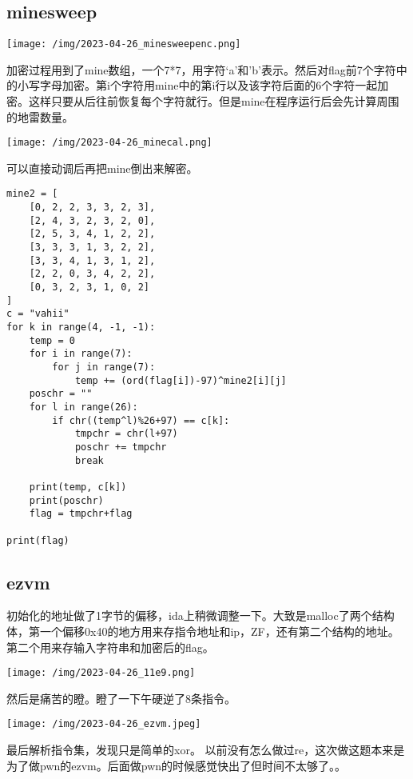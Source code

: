 \documentclass[11pt]{article}
\begin{document}
\subsection{minesweep}
\label{sec:orgc53ffdd}
\begin{center}
\texttt{[image: /img/2023-04-26\_minesweepenc.png]}
\end{center}
加密过程用到了mine数组，一个7*7，用字符‘a'和'b'表示。然后对flag前7个字符中的小写字母加密。第i个字符用mine中的第i行以及该字符后面的6个字符一起加密。这样只要从后往前恢复每个字符就行。但是mine在程序运行后会先计算周围的地雷数量。
\begin{center}
\texttt{[image: /img/2023-04-26\_minecal.png]}
\end{center}
可以直接动调后再把mine倒出来解密。
\begin{verbatim}
mine2 = [
    [0, 2, 2, 3, 3, 2, 3],
    [2, 4, 3, 2, 3, 2, 0],
    [2, 5, 3, 4, 1, 2, 2],
    [3, 3, 3, 1, 3, 2, 2],
    [3, 3, 4, 1, 3, 1, 2],
    [2, 2, 0, 3, 4, 2, 2],
    [0, 3, 2, 3, 1, 0, 2]
]
c = "vahii"
for k in range(4, -1, -1):
    temp = 0
    for i in range(7):
        for j in range(7):
            temp += (ord(flag[i])-97)^mine2[i][j]
    poschr = ""
    for l in range(26):
        if chr((temp^l)%26+97) == c[k]:
            tmpchr = chr(l+97)
            poschr += tmpchr
            break

    print(temp, c[k])
    print(poschr)
    flag = tmpchr+flag

print(flag)
\end{verbatim}

\subsection{ezvm}
\label{sec:orgceee75b}
初始化的地址做了1字节的偏移，ida上稍微调整一下。大致是malloc了两个结构体，第一个偏移0x40的地方用来存指令地址和ip，ZF，还有第二个结构的地址。第二个用来存输入字符串和加密后的flag。
\begin{center}
\texttt{[image: /img/2023-04-26\_11e9.png]}
\end{center}
然后是痛苦的瞪。瞪了一下午硬逆了8条指令。
\begin{center}
\texttt{[image: /img/2023-04-26\_ezvm.jpeg]}
\end{center}
最后解析指令集，发现只是简单的xor。
以前没有怎么做过re，这次做这题本来是为了做pwn的ezvm。后面做pwn的时候感觉快出了但时间不太够了。。
\end{document}
